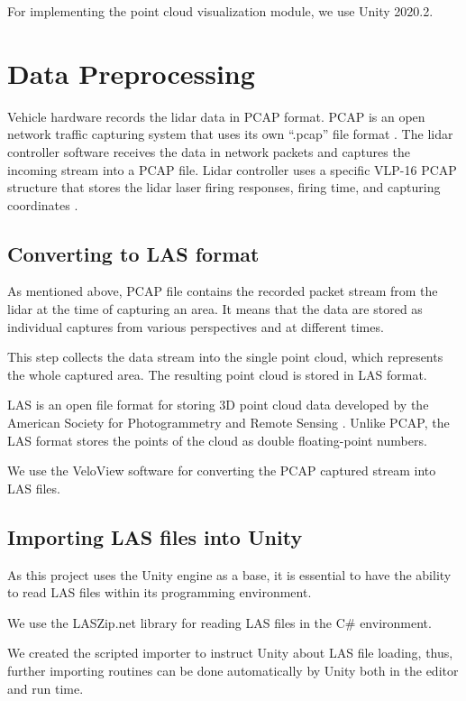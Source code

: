 For implementing the point cloud visualization module, we use Unity 2020.2.


\section{Data Preprocessing}

Vehicle hardware records the lidar data in PCAP format. PCAP is an open network traffic capturing system that uses its own “.pcap” file format \cite{PcapSpec}. The lidar controller software receives the data in network packets and captures the incoming stream into a PCAP file. Lidar controller uses a specific VLP-16 PCAP structure that stores the lidar laser firing responses, firing time, and capturing coordinates \cite{Vlp16PcapSpec}.

\subsection{Converting to LAS format}

As mentioned above, PCAP file contains the recorded packet stream from the lidar at the time of capturing an area. It means that the data are stored as individual captures from various perspectives and at different times.

This step collects the data stream into the single point cloud, which represents the whole captured area. The resulting point cloud is stored in LAS format.

LAS is an open file format for storing 3D point cloud data developed by the American Society for Photogrammetry and Remote Sensing \cite{LasR15}. Unlike PCAP, the LAS format stores the points of the cloud as double floating-point numbers.

We use the VeloView software for converting the PCAP captured stream into LAS files.

\subsection{Importing LAS files into Unity}

As this project uses the Unity engine as a base, it is essential to have the ability to read LAS files within its programming environment. 

We use the LASZip.net library for reading LAS files in the C\# environment.

We created the scripted importer \cite{UnityManScriptedImporters} to instruct Unity about LAS file loading, thus, further importing routines can be done automatically by Unity both in the editor and run time.


